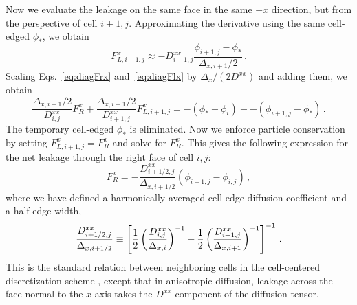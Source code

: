 Now we evaluate the leakage on the same face in the same $+x$ direction, but
from the perspective of cell $i+1,j$. Approximating the derivative using the
same cell-edged $\phi_*$, we obtain
\begin{equation}\label{eq:diagFlx}
  F_{L,i+1,j}^x \approx - 
  D_{i+1,j}^{xx} \frac{\phi_{i+1,j} - \phi_*}{\Delta_{x,i+1}/2} \,.
\end{equation}
Scaling Eqs.~\eqref{eq:diagFrx} and~\eqref{eq:diagFlx} by $\Delta_x/(2 D^{xx})$
and adding them, we obtain
\begin{equation*}
  \frac{\Delta_{x,i+1}/2}{D_{i,j}^{xx}}F_R^x
 + \frac{\Delta_{x,i+1}/2}{D_{i+1,j}^{xx}}F_{L,i+1,j}^x
 = -(\phi_* - \phi_{i}) + -(\phi_{i+1,j} - \phi_*)\,.
\end{equation*}
The temporary cell-edged $\phi_*$ is eliminated. Now we enforce particle
conservation by setting $F_{L,i+1,j}^x = F_R^x$ and solve for $F_R^x$. This
gives the following expression for the net leakage through the right face of
cell $i,j$:
\begin{equation}\label{eq:diagRight}
  F_R^x= -\frac{D^{xx}_{i+1/2,j}}{\Delta_{x,i+1/2}}
  \left( \phi_{i+1,j} - \phi_{i,j} \right)\,,
\end{equation}
where we have defined a harmonically averaged cell edge diffusion coefficient
and a half-edge width,
\begin{equation} \label{eq:cellEdgeDHarmonic}
  \frac{D^{xx}_{i+1/2,j}}{\Delta_{x,i+1/2}} \equiv \left[
  \frac12 \left( \frac{D^{xx}_{i,j}}{\Delta_{x,i}} \right)^{-1}
 + \frac12 \left( \frac{D^{xx}_{i+1,j}}{\Delta_{x,i+1}} \right)^{-1}
  \right]^{-1}\,.
\end{equation}
This is the standard relation between neighboring cells in the
cell-centered discretization scheme \cite{Dud1976}, except that in anisotropic
diffusion, leakage across the face normal to the $x$ axis takes the $D^{xx}$
component of the diffusion tensor.

